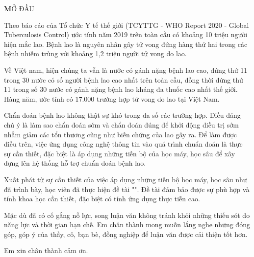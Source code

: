 {\begin{center}
{\textbf MỞ ĐẦU}
\end{center}}
\vspace{10pt}
Theo báo cáo của Tổ chức Y tế thế giới (TCYTTG - WHO Report 2020 - Global Tuberculosis Control)\cite{gtcreport} ước tính năm 2019 trên toàn cầu có khoảng 10 triệu người hiện mắc lao. Bệnh lao là nguyên nhân gây tử vong đứng hàng thứ hai trong các bệnh nhiễm trùng với khoảng 1,2 triệu người tử vong do lao.

Về Việt nam, hiện chúng ta vẫn là nước có gánh nặng bệnh lao cao, đứng thứ 11 trong 30 nước có số người bệnh lao cao nhất trên toàn cầu, đồng thời đứng thứ 11 trong số 30 nước có gánh nặng bệnh lao kháng đa thuốc cao nhất thế giới\cite{gtcreport}. Hàng năm, ước tính có 17.000 trường hợp tử vong do lao tại Việt Nam.

Chẩn đoán bệnh lao không thật sự khó trong đa số các trường hợp. Điều đáng chú ý là làm sao chẩn đoán sớm và chẩn đoán đúng để khởi động điều trị sớm nhằm giảm các tổn thương cũng như biến chứng của lao gây ra. Để làm được điều trên, việc ứng dụng công nghệ thông tin vào quá trình chuẩn đoán là thực sự cần thiết, đặc biệt là áp dụng những tiến bộ của học máy, học sâu để xây dựng lên hệ thống hỗ trợ chuẩn đoán bệnh lao.

Xuất phát từ sự cần thiết của việc áp dụng những tiến bộ học máy, học sâu như đã trình bày, học viên đã thực hiện đề tài "\tenluanvan". Đề tài đảm bảo được sự phù hợp và tính khoa học cần thiết, đặc biệt có tính ứng dụng thực tiễn cao. 

Mặc dù đã có cố gắng nỗ lực, song luận văn không tránh khỏi những thiếu sót do năng lực và thời gian hạn chế. Em chân thành mong muốn lắng nghe những đóng góp, góp ý của thầy, cô, bạn bè, đồng nghiệp để luận văn được cải thiện tốt hơn.

Em xin chân thành cảm ơn.
